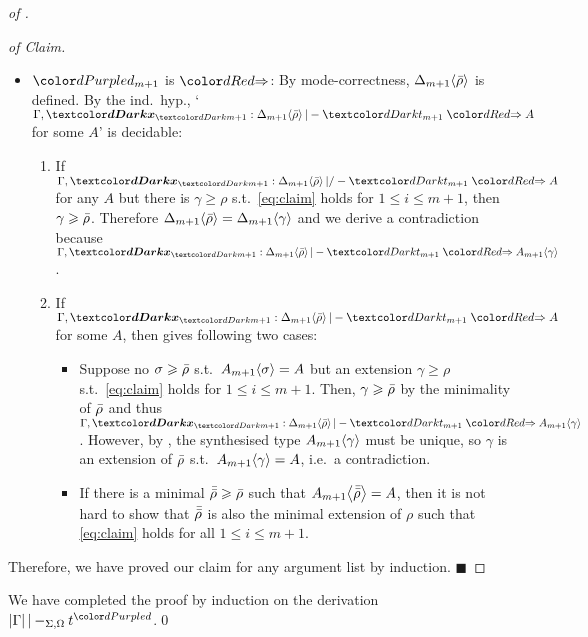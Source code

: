 \begin{proof}[of {}]
\begin{proof}[of Claim]
\begin{enumerate}
\begin{enumerate}
\begin{itemize}
                  \item $\dir{d_{m+1}}$ is $\syn$: By mode-correctness, ${\Delta_{m+1}}\!\left<{\bar{\rho}}\right>$ is defined.
                    By the ind.\ hyp., `$\Gamma, \vars{x}_\isTerm{m+1} : \simsub{\Delta_{m+1}}{\ext{\rho}} |- \isTerm{t_{m+1}} \syn A$ for some $A$' is decidable:
                    \begin{enumerate}
                      \item If $\Gamma, \vars{x}_\isTerm{m+1} : \simsub{\Delta_{m+1}}{\ext{\rho}} |/- \isTerm{t_{m+1}} \syn A$ for any $A$ but there is $\gamma \geq \rho$ s.t.\ \eqref{eq:claim} holds for $1 \leq i \leq m+1$, then $\gamma \geqslant \bar{\rho}$.
                        Therefore ${\Delta_{m+1}}\!\left<{\bar{\rho}}\right> = {\Delta_{m+1}}\!\left<{\gamma}\right>$ and we derive a contradiction because $\Gamma, \vars{x}_\isTerm{m+1} : \simsub{\Delta_{m+1}}{\ext{\rho}} |- \isTerm{t_{m+1}} \syn \simsub{A_{m+1}}{\gamma}$.
                      \item If $\Gamma, \vars{x}_\isTerm{m+1} : \simsub{\Delta_{m+1}}{\ext{\rho}} |- \isTerm{t_{m+1}} \syn A$ for some $A$, then  gives following two cases:
                        \begin{itemize}
                          \item Suppose no $\sigma \geqslant \bar{\rho}$ s.t.\ ${A_{m+1}}\!\left<{\sigma}\right> = A$ but an extension $\gamma \geq \rho$ s.t.\ \eqref{eq:claim} holds for $1 \leq i \leq m + 1$. 
                            Then, $\gamma \geqslant \bar{\rho}$ by the minimality of $\bar{\rho}$ and thus
                            $\Gamma, \vars{x}_\isTerm{m+1} : \simsub{\Delta_{m+1}}{\ext{\rho}} |- \isTerm{t_{m+1}} \syn \simsub{A_{m+1}}{\gamma}$.
                            However, by , the synthesised type ${A_{m+1}}\!\left<{\gamma}\right>$ must be unique, so $\gamma$ is an extension of $\bar{\rho}$ s.t.\ ${A_{m+1}}\!\left<{\gamma}\right> = A$, i.e.\ a contradiction.
                          \item If there is a minimal $\bar{\bar{\rho}} \geqslant \bar{\rho}$ such that ${A_{m+1}}\!\left<{\bar{\bar{\rho}}}\right> = A$, then it is not hard to show that $\bar{\bar{\rho}}$ is also the minimal extension of $\rho$ such that \eqref{eq:claim} holds for all $1 \leq i \leq m + 1$.
                        \end{itemize}
                    \end{enumerate}
                \end{itemize}
            \end{enumerate}
        \end{enumerate}
        Therefore, we have proved our claim for any argument list by induction.\hfill
        $\blacksquare$
      \end{proof}
  We have completed the proof by induction on the derivation $\erase{\Gamma} |-_{\Sigma, \Omega} t^{\dir{d}}$.\qed
\end{proof}

